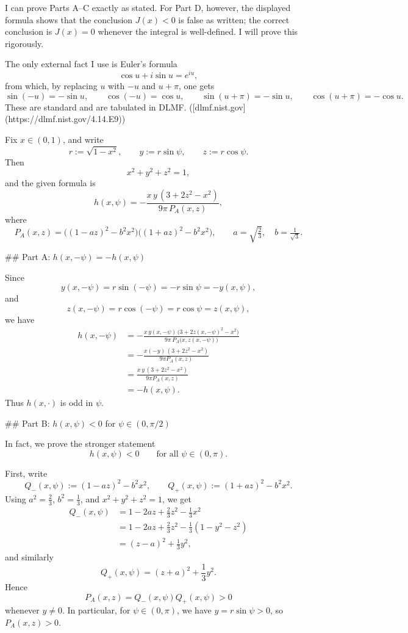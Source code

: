 I can prove Parts A–C exactly as stated. For Part D, however, the displayed formula shows that the conclusion \(J(x)<0\) is false as written; the correct conclusion is \(J(x)=0\) whenever the integral is well-defined. I will prove this rigorously.

The only external fact I use is Euler’s formula
\[
\cos u+i\sin u=e^{iu},
\]
from which, by replacing \(u\) with \(-u\) and \(u+\pi\), one gets
\[
\sin(-u)=-\sin u,\qquad \cos(-u)=\cos u,\qquad \sin(u+\pi)=-\sin u,\qquad \cos(u+\pi)=-\cos u.
\]
These are standard and are tabulated in DLMF. ([dlmf.nist.gov](https://dlmf.nist.gov/4.14.E9))

Fix \(x\in(0,1)\), and write
\[
r:=\sqrt{1-x^2},\qquad y:=r\sin\psi,\qquad z:=r\cos\psi.
\]
Then
\[
x^2+y^2+z^2=1,
\]
and the given formula is
\[
h(x,\psi)= -\frac{x\,y\,(3+2z^2-x^2)}{9\pi\,P_A(x,z)},
\]
where
\[
P_A(x,z)=\bigl((1-az)^2-b^2x^2\bigr)\bigl((1+az)^2-b^2x^2\bigr),
\qquad a=\sqrt{\tfrac23},\quad b=\tfrac1{\sqrt3}.
\]

## Part A: \(h(x,-\psi)=-h(x,\psi)\)

Since
\[
y(x,-\psi)=r\sin(-\psi)=-r\sin\psi=-y(x,\psi),
\]
and
\[
z(x,-\psi)=r\cos(-\psi)=r\cos\psi=z(x,\psi),
\]
we have
\[
\begin{aligned}
h(x,-\psi)
&=-\frac{x\,y(x,-\psi)\,\bigl(3+2z(x,-\psi)^2-x^2\bigr)}
{9\pi\,P_A\bigl(x,z(x,-\psi)\bigr)}\\
&=-\frac{x(-y)\,(3+2z^2-x^2)}{9\pi P_A(x,z)}\\
&=\frac{x\,y\,(3+2z^2-x^2)}{9\pi P_A(x,z)}\\
&=-h(x,\psi).
\end{aligned}
\]
Thus \(h(x,\cdot)\) is odd in \(\psi\).

## Part B: \(h(x,\psi)<0\) for \(\psi\in(0,\pi/2)\)

In fact, we prove the stronger statement
\[
h(x,\psi)<0\qquad\text{for all }\psi\in(0,\pi).
\]

First, write
\[
Q_-(x,\psi):=(1-az)^2-b^2x^2,\qquad Q_+(x,\psi):=(1+az)^2-b^2x^2.
\]
Using \(a^2=\tfrac23\), \(b^2=\tfrac13\), and \(x^2+y^2+z^2=1\), we get
\[
\begin{aligned}
Q_-(x,\psi)
&=1-2az+\frac23 z^2-\frac13 x^2\\
&=1-2az+\frac23 z^2-\frac13(1-y^2-z^2)\\
&=(z-a)^2+\frac13 y^2,
\end{aligned}
\]
and similarly
\[
Q_+(x,\psi)=(z+a)^2+\frac13 y^2.
\]
Hence
\[
P_A(x,z)=Q_-(x,\psi)Q_+(x,\psi)>0
\]
whenever \(y\neq 0\). In particular, for \(\psi\in(0,\pi)\), we have \(y=r\sin\psi>0\), so \(P_A(x,z)>0\).

